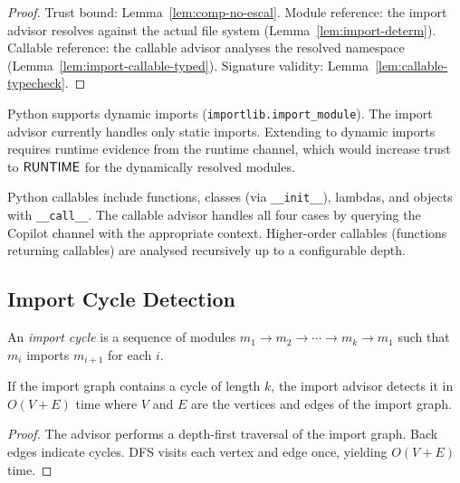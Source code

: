 \documentclass[11pt]{article}
\begin{document}
\begin{proof}
Trust bound: Lemma~\ref{lem:comp-no-escal}.
Module reference: the import advisor resolves against the
actual file system (Lemma~\ref{lem:import-determ}).
Callable reference: the callable advisor analyses the resolved
namespace (Lemma~\ref{lem:import-callable-typed}).
Signature validity: Lemma~\ref{lem:callable-typecheck}.
\end{proof}

\begin{remark}
Python supports dynamic imports (\texttt{importlib.import\_module}).
The import advisor currently handles only static imports.
Extending to dynamic imports requires runtime evidence from
the runtime channel, which would increase trust to $\mathsf{RUNTIME}$
for the dynamically resolved modules.
\end{remark}

\begin{remark}
Python callables include functions, classes (via \texttt{\_\_init\_\_}),
lambdas, and objects with \texttt{\_\_call\_\_}.  The callable
advisor handles all four cases by querying the Copilot channel
with the appropriate context.  Higher-order callables (functions
returning callables) are analysed recursively up to a configurable
depth.
\end{remark}

\subsection{Import Cycle Detection}

\begin{definition}%
\label{def:importcycle}
An \emph{import cycle} is a sequence of modules
$m_1 \to m_2 \to \cdots \to m_k \to m_1$ such that
$m_i$ imports $m_{i+1}$ for each $i$.
\end{definition}

\begin{lemma}%
\label{lem:importcycledetect}
If the import graph contains a cycle of length $k$,
the import advisor detects it in $O(V + E)$ time
where $V$ and $E$ are the vertices and edges of the
import graph.
\end{lemma}
\begin{proof}
The advisor performs a depth-first traversal of the import
graph.  Back edges indicate cycles.  DFS visits each vertex
and edge once, yielding $O(V + E)$ time.
\end{proof}
\end{document}

